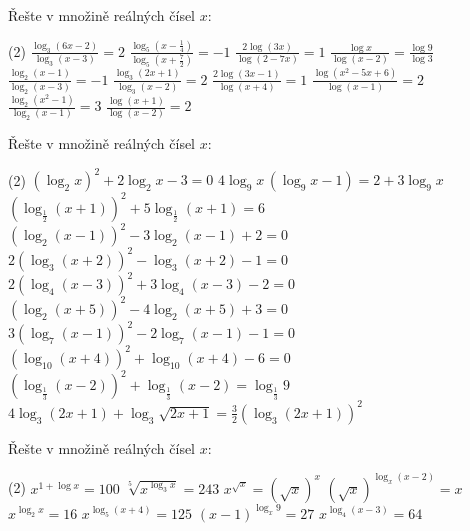 \begin{exercise}
    Řešte v množině reálných čísel $x$:
    \begin{tasks}(2)
        \task $\displaystyle \frac{\log_3(6x-2)}{\log_3(x-3)} = 2$
        \task $\displaystyle \frac{\log_5\left(x - \frac{1}{4}\right)}{\log_5\left(x + \frac{7}{2}\right)} = -1$
        \task $\displaystyle \frac{2\log(3x)}{\log(2-7x)} = 1$
        \task $\displaystyle \frac{\log x}{\log(x-2)} = \frac{\log 9}{\log 3}$
        \task $\displaystyle \frac{\log_2(x-1)}{\log_2(x-3)} = -1$
        \task $\displaystyle \frac{\log_3(2x+1)}{\log_3(x-2)} = 2$
        \task $\displaystyle \frac{2\log(3x-1)}{\log(x+4)} = 1$
        \task $\displaystyle \frac{\log(x^2-5x+6)}{\log(x-1)} = 2$
        \task $\displaystyle \frac{\log_2(x^2-1)}{\log_2(x-1)} = 3$
        \task $\displaystyle \frac{\log(x+1)}{\log(x-2)} = 2$
    \end{tasks}
\end{exercise}


\begin{exercise}
    Řešte v množině reálných čísel $x$:
    \begin{tasks}(2)
        \task $\left(\log_{2} x\right)^{2} + 2\log_{2} x - 3 = 0$
        \task $4\log_{9} x \,(\log_{9} x - 1) = 2 + 3\log_{9} x$
        \task $\left(\log_{\frac12}(x+1)\right)^{2} + 5\log_{\frac12}(x+1) = 6$
        \task $\left(\log_{2}(x-1)\right)^{2} - 3\log_{2}(x-1) + 2 = 0$
        \task $2\left(\log_{3}(x+2)\right)^{2} - \log_{3}(x+2) - 1 = 0$
        \task $2\left(\log_{4}(x-3)\right)^{2} + 3\log_{4}(x-3) - 2 = 0$
        \task $\left(\log_{2}(x+5)\right)^{2} - 4\log_{2}(x+5) + 3 = 0$
        \task $3\left(\log_{7}(x-1)\right)^{2} - 2\log_{7}(x-1) - 1 = 0$
        \task $\left(\log_{10}(x+4)\right)^{2} + \log_{10}(x+4) - 6 = 0$        
        \task {}
        \task $\left(\log_{\frac13}(x-2)\right)^{2} + \log_{\frac13}(x-2) = \log_{\frac13} 9$
        \task $4\log_{3}(2x+1) + \log_{3}\sqrt{2x+1} = \frac{3}{2}\left(\log_{3}(2x+1)\right)^{2}$
    \end{tasks}
\end{exercise}


\begin{exercise}
    Řešte v množině reálných čísel $x$:
    \begin{tasks}(2)
        \task $x^{1+\log x} = 100$
        \task $\sqrt[5]{x^{\log_3 x}} = 243$
        \task $x^{\sqrt{x}} = (\sqrt{x})^{x}$
        \task $(\sqrt{x})^{\log_x (x-2)} = x$
        \task $x^{\log_2 x} = 16$
        \task $x^{\log_5 (x+4)} = 125$
        \task $(x-1)^{\log_x 9} = 27$
        \task $x^{\log_4 (x-3)} = 64$
    \end{tasks}
\end{exercise}


